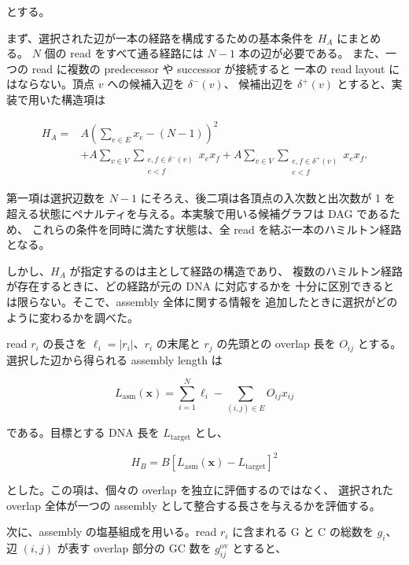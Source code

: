 \documentclass[a4j,10pt]{ujarticle}
\begin{document}
とする。

まず、選択された辺が一本の経路を構成するための基本条件を $H_A$ にまとめる。
$N$ 個の read をすべて通る経路には $N-1$ 本の辺が必要である。
また、一つの read に複数の predecessor や successor が接続すると
一本の read layout にはならない。頂点 $v$ への候補入辺を $\delta^-(v)$、
候補出辺を $\delta^+(v)$ とすると、実装で用いた構造項は

\begin{equation}
\begin{aligned}
H_A
={}&
A
\left(
\sum_{e\in E}x_e-(N-1)
\right)^2
\\
&+
A\sum_{v\in V}
\sum_{\substack{e,f\in\delta^-(v)\\e<f}}
x_e x_f
+
A\sum_{v\in V}
\sum_{\substack{e,f\in\delta^+(v)\\e<f}}
x_e x_f .
\end{aligned}
\label{eq:H_A_path}
\end{equation}

第一項は選択辺数を $N-1$ にそろえ、後二項は各頂点の入次数と出次数が
1 を超える状態にペナルティを与える。本実験で用いる候補グラフは DAG であるため、
これらの条件を同時に満たす状態は、全 read を結ぶ一本のハミルトン経路となる。

しかし、$H_A$ が指定するのは主として経路の構造であり、
複数のハミルトン経路が存在するときに、どの経路が元の DNA に対応するかを
十分に区別できるとは限らない。そこで、assembly 全体に関する情報を
追加したときに選択がどのように変わるかを調べた。

read $r_i$ の長さを $\ell_i=|r_i|$、$r_i$ の末尾と $r_j$ の先頭との
overlap 長を $O_{ij}$ とする。選択した辺から得られる assembly length は

\[
L_{\mathrm{asm}}(\boldsymbol{x})
=
\sum_{i=1}^{N}\ell_i
-
\sum_{(i,j)\in E}O_{ij}x_{ij}
\]

である。目標とする DNA 長を $L_{\mathrm{target}}$ とし、

\begin{equation}
H_B
=
B
\left[
L_{\mathrm{asm}}(\boldsymbol{x})
-
L_{\mathrm{target}}
\right]^2
\label{eq:H_length_abcd}
\end{equation}

とした。この項は、個々の overlap を独立に評価するのではなく、
選択された overlap 全体が一つの assembly として整合する長さを与えるかを評価する。

次に、assembly の塩基組成を用いる。read $r_i$ に含まれる G と C の総数を
$g_i$、辺 $(i,j)$ が表す overlap 部分の GC 数を
$g_{ij}^{\mathrm{ov}}$ とすると、
\end{document}
